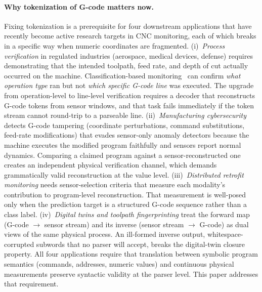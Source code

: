 \documentclass[sensors,article,submit,moreauthors,pdftex]{Definitions/mdpi}
\begin{document}
\paragraph{Why tokenization of G-code matters now.}
Fixing tokenization is a prerequisite for four downstream applications that have recently become active research targets in CNC monitoring, each of which breaks in a specific way when numeric coordinates are fragmented. (i)~\emph{Process verification} in regulated industries (aerospace, medical devices, defense) requires demonstrating that the intended toolpath, feed rate, and depth of cut actually occurred on the machine. Classification-based monitoring~\cite{cnc_anomaly,tool_wear,vibration} can confirm \emph{what operation type} ran but not \emph{which specific G-code line} was executed. The upgrade from operation-level to line-level verification requires a decoder that reconstructs G-code tokens from sensor windows, and that task fails immediately if the token stream cannot round-trip to a parseable line. (ii)~\emph{Manufacturing cybersecurity} detects G-code tampering (coordinate perturbations, command substitutions, feed-rate modifications) that evades sensor-only anomaly detectors because the machine executes the modified program faithfully and sensors report normal dynamics. Comparing a claimed program against a sensor-reconstructed one creates an independent physical verification channel, which demands grammatically valid reconstruction at the value level. (iii)~\emph{Distributed retrofit monitoring} needs sensor-selection criteria that measure each modality's contribution to program-level reconstruction. That measurement is well-posed only when the prediction target is a structured G-code sequence rather than a class label. (iv)~\emph{Digital twins and toolpath fingerprinting} treat the forward map (G-code $\to$ sensor stream) and its inverse (sensor stream $\to$ G-code) as dual views of the same physical process. An ill-formed inverse output, whitespace-corrupted subwords that no parser will accept, breaks the digital-twin closure property. All four applications require that translation between symbolic program semantics (commands, addresses, numeric values) and continuous physical measurements preserve syntactic validity at the parser level. This paper addresses that requirement.
\end{document}
